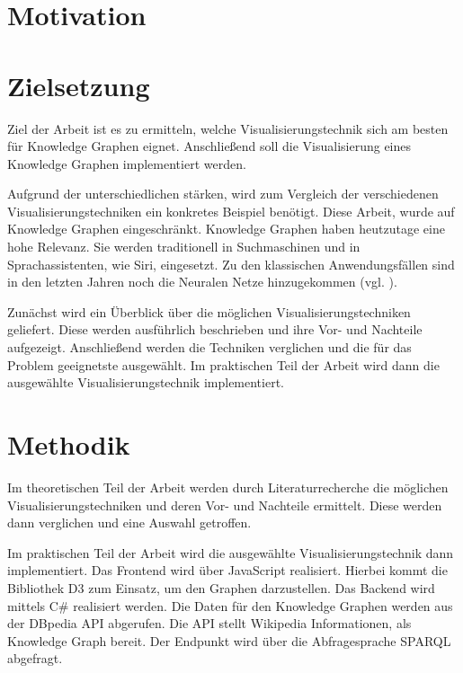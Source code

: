 \section{Motivation}
\section{Zielsetzung}

Ziel der Arbeit ist es zu ermitteln, welche Visualisierungstechnik sich am besten für Knowledge Graphen eignet. Anschließend soll die Visualisierung eines Knowledge Graphen implementiert werden.

Aufgrund der unterschiedlichen stärken, wird zum Vergleich der verschiedenen Visualisierungstechniken ein konkretes Beispiel benötigt. Diese Arbeit, wurde auf Knowledge Graphen eingeschränkt. Knowledge Graphen haben heutzutage eine hohe Relevanz. Sie werden traditionell in Suchmaschinen und in Sprachassistenten, wie Siri, eingesetzt. Zu den klassischen Anwendungsfällen sind in den letzten Jahren noch die Neuralen Netze hinzugekommen (vgl. \cite{wiki:KnowledgeGraph}).

Zunächst wird ein Überblick über die möglichen Visualisierungstechniken geliefert. Diese werden ausführlich beschrieben und ihre Vor- und Nachteile aufgezeigt. Anschließend werden die Techniken verglichen und die für das Problem geeignetste ausgewählt. Im praktischen Teil der Arbeit wird dann die ausgewählte Visualisierungstechnik implementiert. 

\section{Methodik}

Im theoretischen Teil der Arbeit werden durch Literaturrecherche die möglichen Visualisierungstechniken und deren Vor- und Nachteile ermittelt. Diese werden dann verglichen und eine Auswahl getroffen.

Im praktischen Teil der Arbeit wird die ausgewählte Visualisierungstechnik dann implementiert. Das Frontend wird über JavaScript realisiert. Hierbei kommt die Bibliothek D3 zum Einsatz, um den Graphen darzustellen. Das Backend wird mittels C\# realisiert werden. Die Daten für den Knowledge Graphen werden aus der DBpedia API abgerufen. Die API stellt Wikipedia Informationen, als Knowledge Graph bereit. Der Endpunkt wird über die Abfragesprache \ac{SPARQL} abgefragt.

